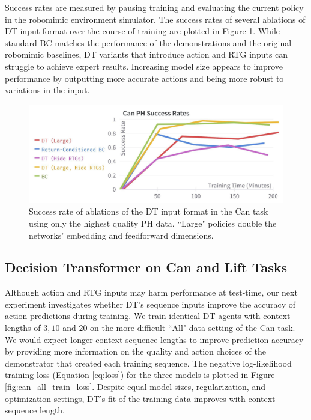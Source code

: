 Success rates are measured by pausing training and evaluating the current policy in the robomimic environment simulator. The success rates of several ablations of DT input format over the course of training are plotted in Figure \ref{fig:can_ph_success_rates}. While standard BC matches the performance of the demonstrations and the original robomimic baselines, DT variants that introduce action and RTG inputs can struggle to achieve expert results. Increasing model size appears to improve performance by outputting more accurate actions and being more robust to variations in the input.

\begin{figure}
    \centering
    \includegraphics[width=\linewidth]{figs/can_ph_success_rates.png}
    \caption{Success rate of ablations of the DT input format in the Can task using only the highest quality PH data. ``Large" policies double the networks' embedding and feedforward dimensions.}
    \label{fig:can_ph_success_rates}
\end{figure}

\subsection{Decision Transformer on Can and Lift Tasks}
Although action and RTG inputs may harm performance at test-time, our next experiment investigates whether DT's sequence inputs improve the accuracy of action predictions during training. We train identical DT agents with context lengths of $3, 10$ and $20$ on the more difficult ``All" data setting of the Can task. We would expect longer context sequence lengths to improve prediction accuracy by providing more information on the quality and action choices of the demonstrator that created each training sequence. The negative log-likelihood training loss (Equation \ref{eq:loss}) for the three models is plotted in Figure \ref{fig:can_all_train_loss}. Despite equal model sizes, regularization, and optimization settings, DT's fit of the training data improves with context sequence length. 

